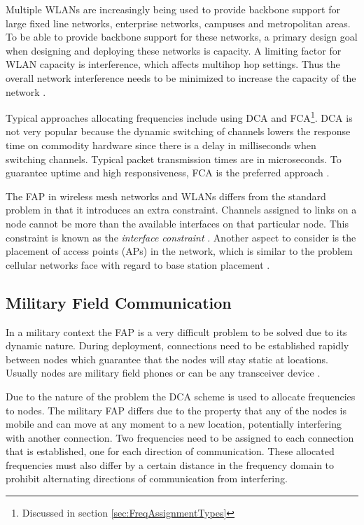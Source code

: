 Multiple WLANs are increasingly being used to provide backbone support for large fixed line networks, enterprise networks, campuses and metropolitan areas. To be able to provide backbone support for these networks, a primary design goal when designing and deploying these networks is capacity. A limiting factor for WLAN capacity is interference, which affects multihop hop settings. Thus the overall network interference needs to be minimized to increase the capacity of the network \cite{MultiradioMeshNetworks}. 

Typical approaches allocating frequencies include using DCA and FCA\footnote{Discussed in section \ref{sec:FreqAssignmentTypes}}. DCA is not very popular because the dynamic switching of channels lowers the response time on commodity hardware since there is a delay in milliseconds when switching channels. Typical packet transmission times are in microseconds. To guarantee uptime and high responsiveness, FCA is the preferred approach \cite{MultiradioMeshNetworks}.

The FAP in wireless mesh networks and WLANs differs from the standard problem in that it introduces an extra constraint. Channels assigned to links on a node cannot be more than the available interfaces on that particular node. This constraint is known as the \emph{interface constraint} \cite{MultiradioMeshNetworks}. Another aspect to consider is the placement of access points (APs) in the network, which is similar to the problem cellular networks face with regard to base station placement \cite{Karen2004}.

\subsection{Military Field Communication}
In a military context the FAP is a very difficult problem to be solved due to its dynamic nature. During deployment, connections need to be established rapidly between nodes which guarantee that the nodes will stay static at locations. Usually nodes are military field phones or can be any transceiver device \cite{CALMA,DynamicFAP}. 

Due to the nature of the problem the DCA scheme is used to allocate frequencies to nodes. The military FAP differs due to the property that any of the nodes is mobile and can move at any moment to a new location, potentially interfering with another connection\cite{CALMA,DynamicFAP}. Two frequencies need to be assigned to each connection that is established, one for each direction of communication. These allocated frequencies must also differ by a certain distance in the frequency domain to prohibit alternating directions of communication from interfering\cite{CALMA,DynamicFAP}.

